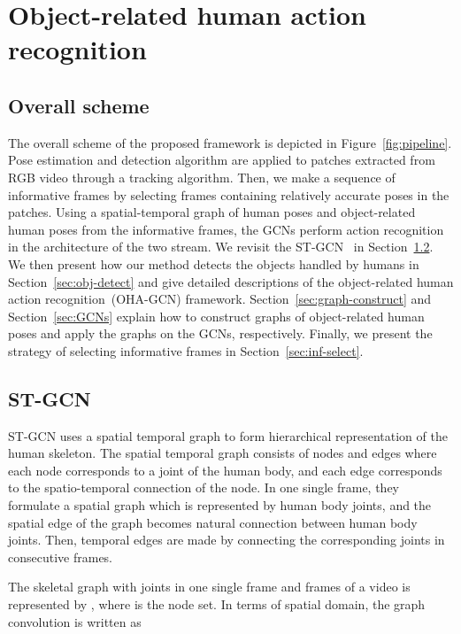 \documentclass[10pt,twocolumn,letterpaper]{article}
\begin{document}
\section{Object-related  human  action recognition}

\subsection{Overall scheme}
\label{sec:overall}
The overall scheme of the proposed framework is depicted in Figure~\ref{fig:pipeline}. Pose estimation and detection algorithm are applied to patches extracted from RGB video through a tracking algorithm. 
Then, we make a sequence of informative frames by selecting frames containing relatively accurate poses in the patches. 
Using a spatial-temporal graph of human poses and object-related human poses from the informative frames, the GCNs perform action recognition
in the architecture of the two stream. 
We revisit the ST-GCN~\cite{stgcn2018aaai} in Section~\ref{sec:gcn-review}.
We then present how our method detects the objects handled by humans in Section~\ref{sec:obj-detect} and give detailed descriptions of the object-related human action recognition~(OHA-GCN) framework.
Section~\ref{sec:graph-construct} and Section~\ref{sec:GCNs} explain how to construct graphs of object-related human poses and apply the graphs on the GCNs, respectively.
Finally, we present the strategy of selecting informative frames in Section~\ref{sec:inf-select}.
\subsection{ST-GCN \cite{stgcn2018aaai}}
\label{sec:gcn-review}
ST-GCN uses a spatial temporal graph to form hierarchical representation of the human skeleton. 
The spatial temporal graph consists of nodes and edges where each node corresponds to a joint of the human body, and each edge corresponds to the spatio-temporal connection of the node.
In one single frame, they formulate a spatial graph which is represented by human body joints, and the spatial edge of the graph becomes natural connection between human body joints.
Then, temporal edges are made by connecting the corresponding joints in consecutive frames.

The skeletal graph with  joints in one single frame and  frames of a video is represented by , where  is the node set.
In terms of spatial domain, the graph convolution is written as 
\end{document}
